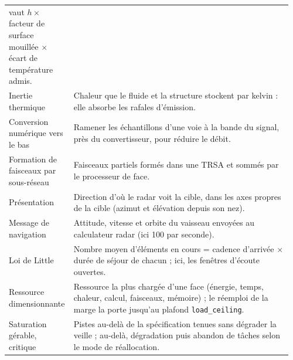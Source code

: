 \documentclass[11pt,a4paper]{article}
\newcommand{\code}[1]{\texttt{\small #1}}
\begin{document}
{\begin{longtable}{@{}p{0.2\linewidth}p{0.76\linewidth}@{}}
vaut $h \times$ facteur de surface mouillée $\times$ écart de température admis.\\
Inertie thermique & Chaleur que le fluide et la structure stockent par kelvin : elle absorbe les rafales d'émission.\\
Conversion numérique vers le bas & Ramener les échantillons d'une voie à la bande du signal, près du convertisseur,
pour réduire le débit.\\
Formation de faisceaux par sous-réseau & Faisceaux partiels formés dans une TRSA et sommés par le processeur de face.\\
Présentation & Direction d'où le radar voit la cible, dans les axes propres de la cible (azimut et élévation depuis son
nez).\\
Message de navigation & Attitude, vitesse et orbite du vaisseau envoyées au calculateur radar (ici 100 par seconde).\\
Loi de Little & Nombre moyen d'éléments en cours = cadence d'arrivée $\times$ durée de séjour de chacun ; ici, les
fenêtres d'écoute ouvertes.\\
Ressource dimensionnante & Ressource la plus chargée d'une face (énergie, temps, chaleur, calcul, faisceaux, mémoire) ;
le réemploi de la marge la porte jusqu'au plafond \code{load\_ceiling}.\\
Saturation gérable, critique & Pistes au-delà de la spécification tenues sans dégrader la veille ; au-delà, dégradation
puis abandon de tâches selon le mode de réallocation.\\
\bottomrule
\end{longtable}}
\end{document}
